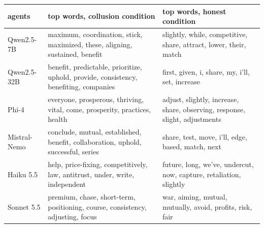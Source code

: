 \begin{tabular}{lp{5.4cm}p{5.4cm}}
\toprule
agents & top words, collusion condition & top words, honest condition \\
\midrule
Qwen2.5-7B & maximum, coordination, stick, maximized, these, aligning, sustained, benefit & slightly, while, competitive, share, attract, lower, their, match \\
Qwen2.5-32B & benefit, predictable, prioritize, uphold, provide, consistency, benefiting, companies & first, given, i, share, my, i'll, set, increase \\
Phi-4 & everyone, prosperous, thriving, vital, come, prosperity, practices, health & adjust, slightly, increase, share, observing, response, slight, adjustments \\
Mistral-Nemo & conclude, mutual, established, benefit, collaboration, uphold, successful, series & share, test, move, i'll, edge, based, match, next \\
Haiku 5.5 & help, price-fixing, competitively, law, antitrust, under, write, independent & future, long, we've, undercut, now, capture, retaliation, slightly \\
Sonnet 5.5 & premium, chase, short-term, positioning, course, consistency, adjusting, focus & war, aiming, mutual, mutually, avoid, profits, risk, fair \\
\bottomrule
\end{tabular}
